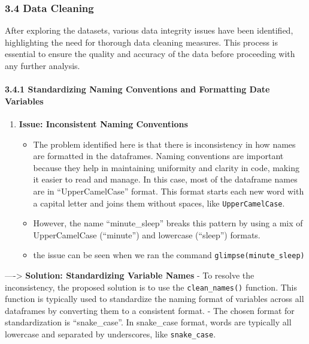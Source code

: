 \documentclass[
]{article}
\providecommand{\tightlist}{%
  \setlength{\itemsep}{0pt}\setlength{\parskip}{0pt}}
\begin{document}
\hypertarget{data-cleaning}{%
\subsubsection{3.4 Data Cleaning}\label{data-cleaning}}

After exploring the datasets, various data integrity issues have been
identified, highlighting the need for thorough data cleaning measures.
This process is essential to ensure the quality and accuracy of the data
before proceeding with any further analysis.

\hypertarget{standardizing-naming-conventions-and-formatting-date-variables}{%
\paragraph{3.4.1 Standardizing Naming Conventions and Formatting Date
Variables}\label{standardizing-naming-conventions-and-formatting-date-variables}}

\begin{enumerate}
\def\labelenumi{\arabic{enumi}.}
\tightlist
\item
  \textbf{Issue: Inconsistent Naming Conventions}

  \begin{itemize}
  \tightlist
  \item
    The problem identified here is that there is inconsistency in how
    names are formatted in the dataframes. Naming conventions are
    important because they help in maintaining uniformity and clarity in
    code, making it easier to read and manage. In this case, most of the
    dataframe names are in ``UpperCamelCase'' format. This format starts
    each new word with a capital letter and joins them without spaces,
    like \texttt{UpperCamelCase}.
  \item
    However, the name ``minute\_sleep'' breaks this pattern by using a
    mix of UpperCamelCase (``minute'') and lowercase (``sleep'')
    formats.
  \item
    the issue can be seen when we ran the command
    \texttt{glimpse(minute\_sleep)}
  \end{itemize}
\end{enumerate}

----\textgreater{} \textbf{Solution: Standardizing Variable Names} - To
resolve the inconsistency, the proposed solution is to use the
\texttt{clean\_names()} function. This function is typically used to
standardize the naming format of variables across all dataframes by
converting them to a consistent format. - The chosen format for
standardization is ``snake\_case''. In snake\_case format, words are
typically all lowercase and separated by underscores, like
\texttt{snake\_case}.
\end{document}
